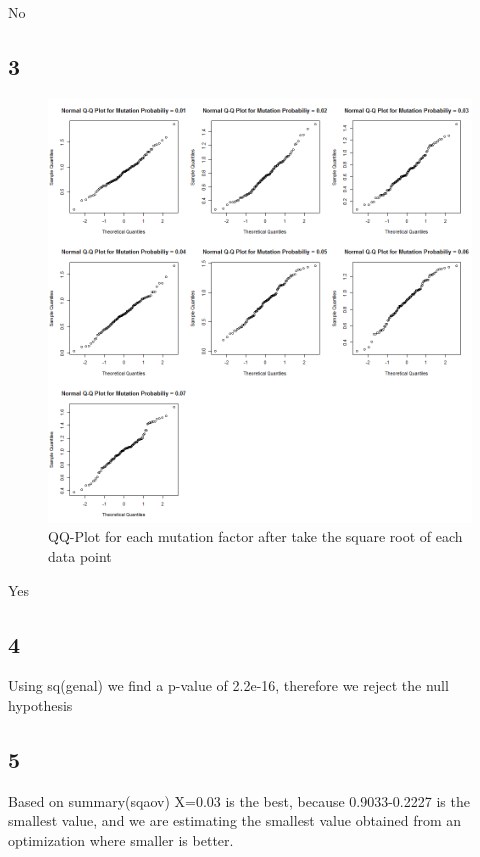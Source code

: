 \documentclass{article}
\begin{document}
    No
    
    \subsection*{3}
    
    \begin{figure}[!htb]
      \includegraphics[scale=0.4]{../results/3_3.png}
      \caption{QQ-Plot for each mutation factor after take the square root of each data point}
      \label{fig:qq-sqgenal}
    \end{figure}
    
    Yes
    
    \subsection*{4}
    
    Using sq(genal) we find a p-value of 2.2e-16, therefore we reject the null hypothesis
    
    \subsection*{5}
    
    Based on summary(sqaov) X=0.03 is the best, because 0.9033-0.2227 is the smallest value, and we are estimating the smallest value obtained from an optimization where smaller is better.
    
\end{document}
